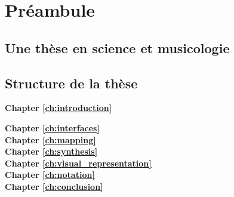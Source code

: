 %
\chapter{Préambule}
\label{ch:preamble}


\Blindtext[2][2]

\section{Une thèse en science et musicologie}


\section{Structure de la thèse}
\label{sec:preamble:structure}

\textbf{Chapter \ref{ch:introduction}} \\[0.2em]
\blindtext

\textbf{Chapter \ref{ch:interfaces}} \\[0.2em]

\textbf{Chapter \ref{ch:mapping}} \\[0.2em]

\textbf{Chapter \ref{ch:synthesis}} \\[0.2em]

\textbf{Chapter \ref{ch:visual_representation}} \\[0.2em]

\textbf{Chapter \ref{ch:notation}} \\[0.2em]

\textbf{Chapter \ref{ch:conclusion}} \\[0.2em]
